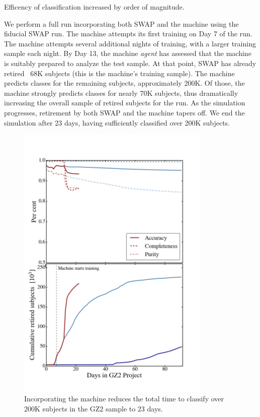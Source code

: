 \documentclass[twocolumn]{aastex6}
\begin{document}
Efficency of classification increased by order of magnitude. 

We perform a full run incorporating both SWAP and the machine using the fiducial SWAP run.
The machine attempts its first training on Day 7 of the run. The machine attempts several 
additional nights of training, with a larger training sample each night. By Day 13, 
the machine \textit{agent} has assessed that the machine is suitably prepared to 
analyze the test sample. At that point, SWAP has already retired ~68K subjects 
(this is the machine's training sample). The machine predicts classes for the remaining
subjects, approximately 200K. Of those, the machine strongly predicts classes for 
nearly 70K subjects, thus dramatically increasing the overall sample of retired 
subjects for the run. As the simulation progresses, retirement by both SWAP and
the machine tapers off. We end the simulation after 23 days, having sufficiently 
classified over 200K subjects. 

\begin{figure}[t!]
\includegraphics[width=3.65in]{figures/moneyplot.png}
\caption{Incorporating the machine reduces the total time to classify over 200K subjects in the GZ2 sample to 23 days. \label{fig: money}}
\end{figure}
\end{document}
